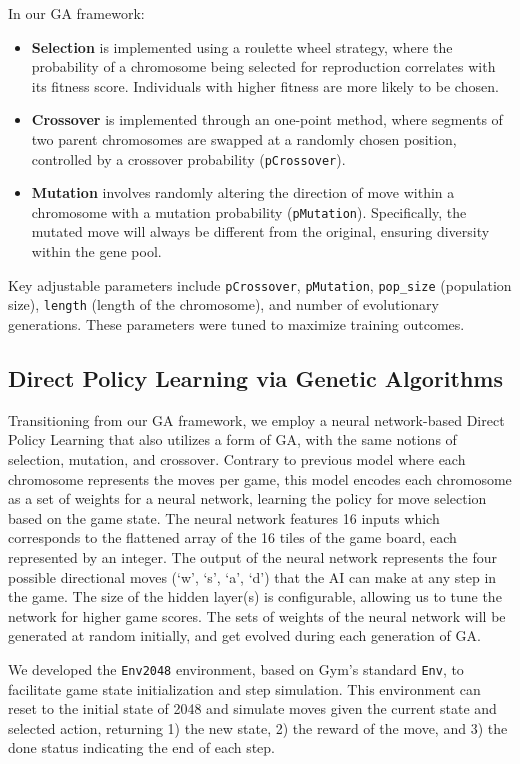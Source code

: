 \documentclass[11pt]{article}
\begin{document}
In our GA framework:

\begin{itemize}[leftmargin=*]
  \item \textbf{Selection} is implemented using a roulette wheel strategy, where the probability of a chromosome being selected for reproduction correlates with its fitness score. Individuals with higher fitness are more likely to be chosen.
  \item \textbf{Crossover} is implemented through an one-point method, where segments of two parent chromosomes are swapped at a randomly chosen position, controlled by a crossover probability (\texttt{pCrossover}). 
  \item \textbf{Mutation} involves randomly altering the direction of move within a chromosome with a mutation probability (\texttt{pMutation}). Specifically, the mutated move will always be different from the original, ensuring diversity within the gene pool. 
\end{itemize}

Key adjustable parameters include \texttt{pCrossover}, \texttt{pMutation}, \texttt{pop\_size} (population size), \texttt{length} (length of the chromosome), and number of evolutionary generations. These parameters were tuned to maximize training outcomes.

\subsection{Direct Policy Learning via Genetic Algorithms}
Transitioning from our GA framework, we employ a neural network-based Direct Policy Learning that also utilizes a form of GA, with the same notions of selection, mutation, and crossover. Contrary to previous model where each chromosome represents the moves per game, this model encodes each chromosome as a set of weights for a neural network, learning the policy for move selection based on the game state. The neural network features 16 inputs which corresponds to the flattened array of the 16 tiles of the game board, each represented by an integer. The output of the neural network represents the four possible directional moves (‘w’, ‘s’, ‘a’, ‘d’) that the AI can make at any step in the game. The size of the hidden layer(s) is configurable, allowing us to tune the network for higher game scores. The sets of weights of the neural network will be generated at random initially, and get evolved during each generation of GA. 

We developed the \texttt{Env2048} environment, based on Gym's standard \texttt{Env}, to facilitate game state initialization and step simulation. This environment can reset to the initial state of 2048 and simulate moves given the current state and selected action, returning 1) the new state, 2) the reward of the move, and 3) the done status indicating the end of each step.
\end{document}
